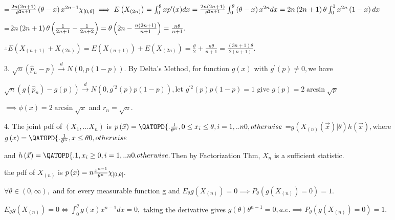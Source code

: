 \documentclass{article}
\begin{document}
=$\frac{2n\left( 2n+1\right) }{\theta ^{2n+1}}\left( \theta -x\right)
x^{2n-1}\chi _{\lbrack 0,\theta ]}\implies E\left( X_{\left( 2n\right)
}\right) =\int_{0}^{\theta }xp^{\prime }(x)dx=\frac{2n\left( 2n+1\right) }{%
\theta ^{2n+1}}\int_{0}^{\theta }\left( \theta -x\right) x^{2n}dx=2n\left(
2n+1\right) \theta \int_{0}^{1}x^{2n}\left( 1-x\right) dx$

=$2n\left( 2n+1\right) \theta \left( \frac{1}{2n+1}-\frac{1}{2n+2}\right)
=\theta \left( 2n-\frac{n\left( 2n+1\right) }{n+1}\right) =\allowbreak \frac{%
n\theta }{n+1}.$

$\therefore E\left( X_{\left( n+1\right) }+X_{\left( 2n\right) }\right)
=E\left( X_{\left( n+1\right) }\right) +E\left( X_{\left( 2n\right) }\right)
=\frac{\theta }{2}+\allowbreak \frac{n\theta }{n+1}=\frac{\left( 3n+1\right)
\theta }{2\left( n+1\right) }.$

3. $\sqrt{n}\left( \hat{p}_{n}-p\right) \overset{d}{\rightarrow }N\left(
0,p\left( 1-p\right) \right) .$ By Delta's Method, for function $g\left(
x\right) $ with $g^{\prime }\left( p\right) \neq 0,$we have

$\sqrt{n}\left( g\left( \hat{p}_{n}\right) -g\left( p\right) \right) \overset%
{d}{\rightarrow }N\left( 0,g^{\prime 2}\left( p\right) p\left( 1-p\right)
\right) ,$let $g^{\prime 2}\left( p\right) p\left( 1-p\right) =1$ give $%
g\left( p\right) =2\arcsin \sqrt{p}$

$\implies \phi \left( x\right) =2\arcsin \sqrt{x}$ and $r_{n}=\sqrt{n}.$

4. The joint pdf of $\left( X_{1},...X_{n}\right) $ is $p\left( \vec{x}%
\right) =\QATOPD\{ . {\frac{1}{\theta ^{n}},0\leq x_{i}\leq \theta
,i=1,..n}{0,otherwise}$ =$g\left( X_{\left( n\right) }\left( \vec{x}\right)
|\theta \right) h\left( \vec{x}\right) ,$where $g\left( x\right) =\QATOPD\{
. {\frac{1}{\theta ^{n}},x\leq \theta }{0,otherwise}$

and $h\left( \vec{x}\right) =\QATOPD\{ . {1,x_{i}\geq
0,i=1,..n}{0.otherwise}.$Then by Factorization Thm, $X_{n}$ is a sufficient
statistic.

the pdf of $X_{\left( n\right) }$ is $p\left( x\right) =n\frac{x^{n-1}}{%
\theta ^{n}}\chi _{\lbrack 0,\theta ]}.$

$\forall \theta \in \left( 0,\infty \right) ,$ and for every measurable
function g and $E_{\theta }g\left( X_{\left( n\right) }\right) =0\implies
P_{\theta }\left( g\left( X_{\left( n\right) }\right) =0\right) =1.$

$E_{\theta }g\left( X_{\left( n\right) }\right) =0\iff \int_{0}^{\theta
}g\left( x\right) x^{n-1}dx=0,$ taking the derivative gives $g\left( \theta
\right) \theta ^{n-1}=0,a.e.\implies P_{\theta }\left( g\left( X_{\left(
n\right) }\right) =0\right) =1.$
\end{document}
